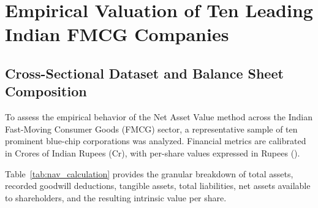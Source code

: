 
\section[Empirical Valuation of FMCG Firms]{Empirical Valuation of Ten Leading Indian FMCG Companies}

\subsection{Cross-Sectional Dataset and Balance Sheet Composition}
To assess the empirical behavior of the Net Asset Value method across the Indian Fast-Moving Consumer Goods (FMCG) sector, a representative sample of ten prominent blue-chip corporations was analyzed. Financial metrics are calibrated in Crores of Indian Rupees (\inr Cr), with per-share values expressed in Rupees (\inr).

Table~\ref{tab:nav_calculation} provides the granular breakdown of total assets, recorded goodwill deductions, tangible assets, total liabilities, net assets available to shareholders, and the resulting intrinsic value per share.

